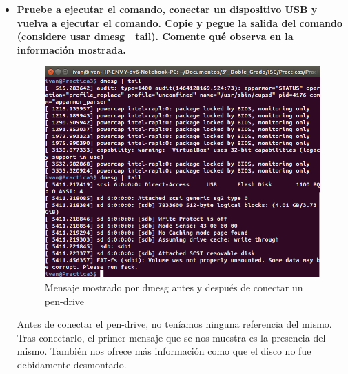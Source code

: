\begin{itemize}
	\item \textbf{Pruebe a ejecutar el comando, conectar un dispositivo USB y vuelva a
		ejecutar el comando. Copie y pegue la salida del comando (considere usar dmesg |
		tail). Comente qué observa en la información mostrada.}\\
	
	\begin{figure}[H]
	\centering
	\includegraphics[width=0.7\linewidth]{dmesgPenDrive}
	\caption[dmesg]{Mensaje mostrado por dmesg antes y después de conectar un pen-drive}
	\label{fig:dmesgPenDrive}
	\end{figure}
	
	Antes de conectar el pen-drive, no teníamos ninguna referencia del mismo. Tras conectarlo, el primer mensaje que se nos muestra es la presencia del mismo. También nos ofrece más información como que el disco no fue debidamente desmontado.

	
\end{itemize}
